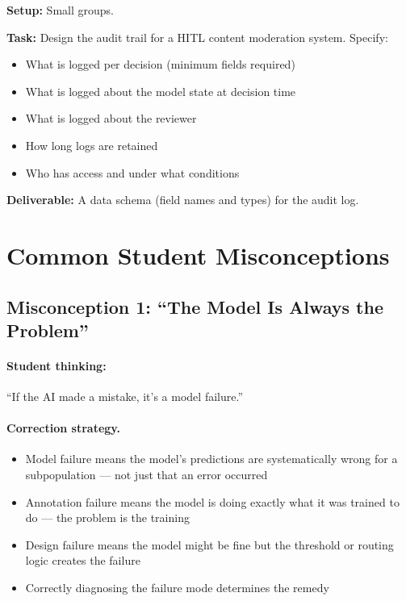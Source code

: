 \textbf{Setup:} Small groups.

\textbf{Task:} Design the audit trail for a HITL content moderation system. Specify:
\begin{itemize}
    \item What is logged per decision (minimum fields required)
    \item What is logged about the model state at decision time
    \item What is logged about the reviewer
    \item How long logs are retained
    \item Who has access and under what conditions
\end{itemize}

\textbf{Deliverable:} A data schema (field names and types) for the audit log.

\section{Common Student Misconceptions}

\subsection{Misconception 1: ``The Model Is Always the Problem''}

\paragraph{Student thinking:} ``If the AI made a mistake, it's a model failure.''

\paragraph{Correction strategy.}
\begin{itemize}
    \item Model failure means the model's predictions are systematically wrong for a subpopulation --- not just that an error occurred
    \item Annotation failure means the model is doing exactly what it was trained to do --- the problem is the training
    \item Design failure means the model might be fine but the threshold or routing logic creates the failure
    \item Correctly diagnosing the failure mode determines the remedy
\end{itemize}

